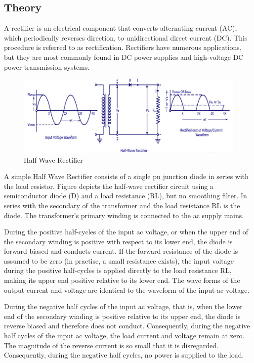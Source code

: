 \documentclass{article}
\begin{document}
\subsection{Theory}
A rectifier is an electrical component that converts alternating current (AC), which periodically reverses direction, to unidirectional direct current (DC). This procedure is referred to as rectification. Rectifiers have numerous applications, but they are most commonly found in DC power supplies and high-voltage DC power transmission systems.\par
\begin{figure}[h!]
    \centering
    \includegraphics[width=1\textwidth]{pic1.png}
    \caption{Half Wave Rectifier}
\end{figure}
A simple Half Wave Rectifier consists of a single pn junction diode in series with the load resistor. Figure depicts the half-wave rectifier circuit using a semiconductor diode (D) and a load resistance (RL), but no smoothing filter. In series with the secondary of the transformer and the load resistance RL is the diode. The transformer's primary winding is connected to the ac supply mains.\par
During the positive half-cycles of the input ac voltage, or when the upper end of the secondary winding is positive with respect to its lower end, the diode is forward biased and conducts current. If the forward resistance of the diode is assumed to be zero (in practise, a small resistance exists), the input voltage during the positive half-cycles is applied directly to the load resistance RL, making its upper end positive relative to its lower end. The wave forms of the output current and voltage are identical to the waveform of the input ac voltage.\par
During the negative half cycles of the input ac voltage, that is, when the lower end of the secondary winding is positive relative to its upper end, the diode is reverse biased and therefore does not conduct. Consequently, during the negative half cycles of the input ac voltage, the load current and voltage remain at zero. The magnitude of the reverse current is so small that it is disregarded. Consequently, during the negative half cycles, no power is supplied to the load.
\end{document}

